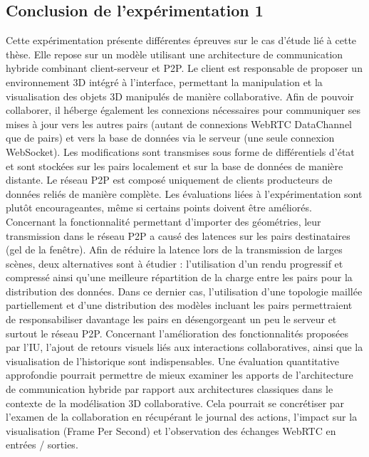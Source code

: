 \subsection{Conclusion de l'expérimentation 1}


Cette expérimentation présente différentes épreuves sur le cas d'étude lié à cette 
thèse. Elle repose sur un modèle utilisant une architecture de communication 
hybride combinant client-serveur et \gls{P2P}. Le client est responsable de 
proposer un environnement \gls{3D} intégré à l'interface, permettant la 
manipulation et 
la visualisation des objets \gls{3D} manipulés de manière collaborative. Afin de 
pouvoir 
collaborer, il héberge également les connexions nécessaires pour communiquer ses 
mises à jour vers les autres pairs (autant de connexions WebRTC DataChannel que 
de pairs) et vers la base de données via le serveur (une seule connexion 
WebSocket). Les modifications sont transmises sous forme de différentiels d'état et 
sont stockées sur les pairs localement et sur la base de données de manière 
distante. Le réseau \gls{P2P} est composé uniquement de clients producteurs de 
données reliés de manière complète. 
Les évaluations liées à l'expérimentation sont plutôt encourageantes, même si 
certains points doivent être améliorés. Concernant la fonctionnalité permettant 
d'importer des géométries, leur transmission dans le réseau \gls{P2P} a causé 
des latences sur les pairs destinataires (gel de la fenêtre). 
Afin de réduire la latence lors de la transmission de larges scènes, deux alternatives 
sont à étudier : l'utilisation d'un 
rendu progressif et compressé ainsi qu'une meilleure répartition de la charge entre 
les pairs pour la distribution des données. Dans ce dernier cas, l'utilisation d'une 
topologie maillée partiellement et d'une distribution des modèles incluant les pairs 
permettraient de responsabiliser davantage les pairs en désengorgeant
un peu le serveur et surtout le réseau \gls{P2P}.
Concernant l'amélioration des fonctionnalités proposées par l'\gls{IU}, 
l'ajout de retours visuels liés aux interactions collaboratives, 
ainsi que la visualisation de l'historique sont 
indispensables. Une évaluation quantitative approfondie pourrait permettre de 
mieux examiner les apports de l'architecture de communication hybride par rapport 
aux architectures classiques dans le contexte de la modélisation \gls{3D} 
collaborative. 
Cela pourrait se concrétiser par l'examen de la collaboration en récupérant le 
journal des actions, l'impact sur la visualisation (Frame Per Second) et 
l'observation des échanges WebRTC en entrées / sorties.

